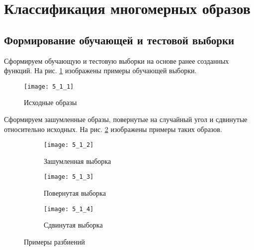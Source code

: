 \newpage

\section{Классификация многомерных образов}


\subsection{Формирование обучающей и тестовой выборки}

Сформируем обучающую и тестовую выборки на основе ранее созданных функций. На рис. \ref{fig:5_1_1} изображены примеры обучающей выборки.
\begin{figure}[H]
\begin{center}
	\texttt{[image: 5\_1\_1]}
	\caption{Исходные образы }
	\label{fig:5_1_1}
\end{center}
\end{figure}

Сформируем зашумленные образы, повернутые на случайный угол и сдвинутые относительно исходных. На рис. \ref{fig:5_1_2} изображены примеры таких образов.
\begin{figure}[H]
\begin{center}
	\begin{subfigure}[b]{\textwidth}
		\texttt{[image: 5\_1\_2]}
		\caption{Зашумленная выборка }
	\end{subfigure}
	\begin{subfigure}[b]{\textwidth}
		\texttt{[image: 5\_1\_3]}
		\caption{Повернутая выборка }
	\end{subfigure}
	\begin{subfigure}[b]{\textwidth}
		\texttt{[image: 5\_1\_4]}
		\caption{Сдвинутая выборка }
	\end{subfigure}
	\caption{Примеры разбиений}
	\label{fig:5_1_2}
\end{center}
\end{figure}

